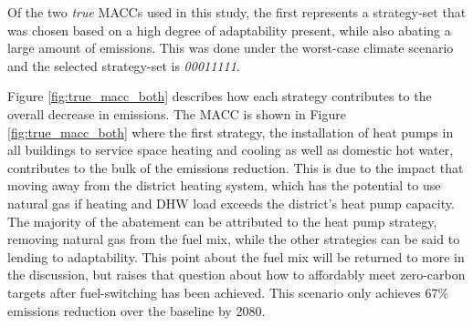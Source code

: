 \documentclass[twocolumn, a4paper,10pt]{article}
\begin{document}

Of the two \textit{true} MACCs used in this study, the first represents a strategy-set that was chosen based on a high degree of adaptability present, while also abating a large amount of emissions. This was done under the worst-case climate scenario and the selected strategy-set is \textit{00011111}.


Figure \ref{fig:true_macc_both} describes how each strategy contributes to the overall decrease in emissions. The MACC is shown in Figure \ref{fig:true_macc_both} where the first strategy, the installation of heat pumps in all buildings to service space heating and cooling as well as domestic hot water, contributes to the bulk of the emissions reduction. This is due to the impact that moving away from the district heating system, which has the potential to use natural gas if heating and DHW load exceeds the district's heat pump capacity. The majority of the abatement can be attributed to the heat pump strategy, removing natural gas from the fuel mix, while the other strategies can be said to lending to adaptability. This point about the fuel mix will be returned to more in the discussion, but raises that question about how to affordably meet zero-carbon targets after fuel-switching has been achieved. This scenario only achieves 67\% emissions reduction over the baseline by 2080.

\end{document}
